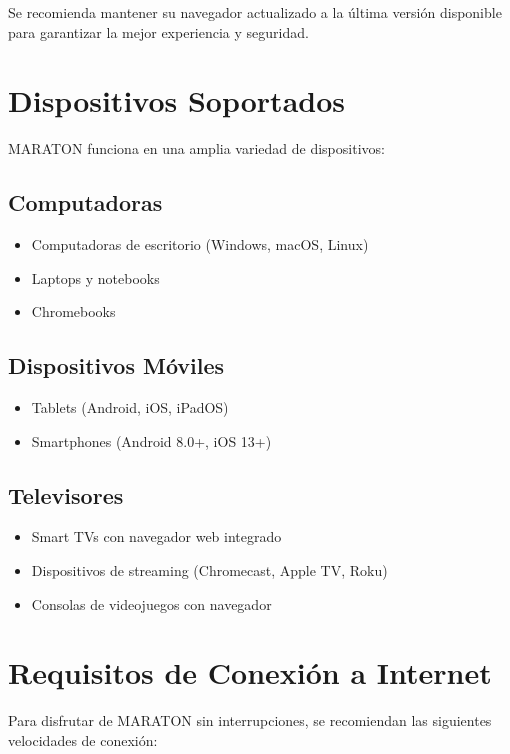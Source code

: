 \documentclass[11pt,a4paper,twoside]{book}
\begin{document}
\begin{notebox}
Se recomienda mantener su navegador actualizado a la última versión disponible para garantizar la mejor experiencia y seguridad.
\end{notebox}

\section{Dispositivos Soportados}

MARATON funciona en una amplia variedad de dispositivos:

\subsection{Computadoras}
\begin{itemize}
    \item Computadoras de escritorio (Windows, macOS, Linux)
    \item Laptops y notebooks
    \item Chromebooks
\end{itemize}

\subsection{Dispositivos Móviles}
\begin{itemize}
    \item Tablets (Android, iOS, iPadOS)
    \item Smartphones (Android 8.0+, iOS 13+)
\end{itemize}

\subsection{Televisores}
\begin{itemize}
    \item Smart TVs con navegador web integrado
    \item Dispositivos de streaming (Chromecast, Apple TV, Roku)
    \item Consolas de videojuegos con navegador
\end{itemize}

\section{Requisitos de Conexión a Internet}

Para disfrutar de MARATON sin interrupciones, se recomiendan las siguientes velocidades de conexión:
\end{document}
